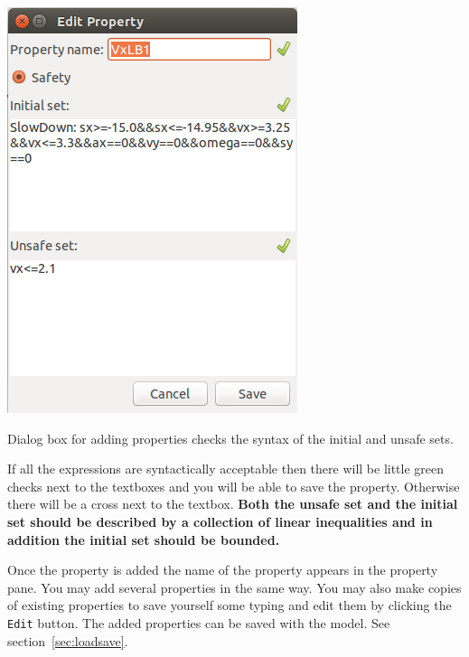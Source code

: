 \documentclass{tufte-book} %
\begin{document}
\begin{marginfigure}
\centerline{\includegraphics[width=\textwidth]{Manual_ver0_2_image/property_dialog.png}}
 \caption{Dialog box for adding properties checks the syntax of the initial and unsafe sets.}
 \label{fig:property dialog}
\end{marginfigure}
%
If all the expressions are syntactically acceptable then there will be little green checks
next to the textboxes and you will be able to save the property. Otherwise there will be a cross next to the textbox.
{\bf Both the unsafe set and the initial set should be described by a collection of linear inequalities and in addition the initial set should be bounded.\/}

Once the property is added the name of the property appears in the property pane. 
You may add several properties in the same way. 
You may also make copies of existing properties to save yourself some typing and edit them by clicking the \texttt{Edit} button.
The added properties can be saved with the model. See section~\ref{sec:loadsave}.
\end{document}
